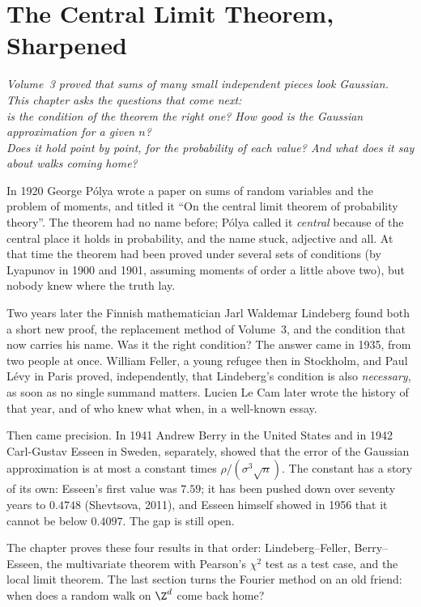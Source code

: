 \chapter{The Central Limit Theorem, Sharpened}
\begin{center}\itshape
Volume~3 proved that sums of many small independent pieces look Gaussian. This chapter asks the questions that come next:\\
is the condition of the theorem the right one? How good is the Gaussian approximation for a given $n$?\\
Does it hold point by point, for the probability of each value? And what does it say about walks coming home?
\end{center}

In 1920 George P\'olya wrote a paper on sums of random variables and the problem of moments, and titled it ``On the central limit theorem of probability
theory''. The theorem had no name before; P\'olya called it \emph{central} because of the central place it holds in probability, and the name stuck,
adjective and all. At that time the theorem had been proved under several sets of conditions (by Lyapunov in 1900 and 1901, assuming moments of order a little above two), but nobody
knew where the truth lay.

Two years later the Finnish mathematician Jarl Waldemar Lindeberg found both a short new proof, the replacement method of Volume~3, and the condition
that now carries his name. Was it the right condition? The answer came in 1935, from two people at once. William Feller, a young refugee then in
Stockholm, and Paul L\'evy in Paris proved, independently, that Lindeberg's condition is also \emph{necessary}, as soon as no single summand
matters. Lucien Le Cam later wrote the history of that year, and of who knew what when, in a well-known essay.

Then came precision. In 1941 Andrew Berry in the United States and in 1942 Carl-Gustav Esseen in Sweden, separately, showed that the error of the
Gaussian approximation is at most a constant times $\rho/(\sigma^3\sqrt n)$. The constant has a story of its own: Esseen's first value was $7.59$; it has
been pushed down over seventy years to $0.4748$ (Shevtsova, 2011), and Esseen himself showed in 1956 that it cannot be below $0.4097$. The gap is
still open.

The chapter proves these four results in that order: Lindeberg--Feller, Berry--Esseen, the multivariate theorem with Pearson's $\chi^2$ test as
a test case, and the local limit theorem. The last section turns the Fourier method on an old friend: when does a random walk on $\Z^d$ come back home?

